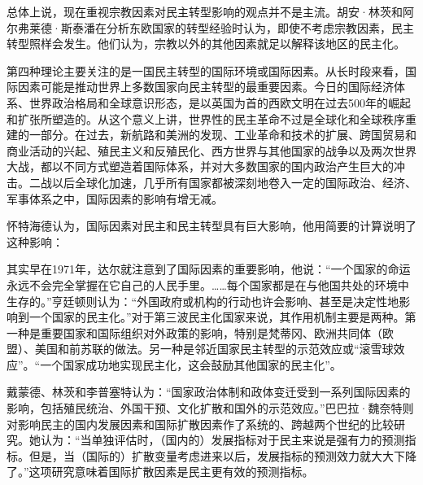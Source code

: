 总体上说，现在重视宗教因素对民主转型影响的观点并不是主流。胡安·林茨和阿尔弗莱德·斯泰潘在分析东欧国家的转型经验时认为，即使不考虑宗教因素，民主转型照样会发生。他们认为，宗教以外的其他因素就足以解释该地区的民主化。


第四种理论主要关注的是一国民主转型的国际环境或国际因素。从长时段来看，国际因素可能是推动世界上多数国家向民主转型的最重要因素。今日的国际经济体系、世界政治格局和全球意识形态，是以英国为首的西欧文明在过去500年的崛起和扩张所塑造的。从这个意义上讲，世界性的民主革命不过是全球化和全球秩序重建的一部分。在过去，新航路和美洲的发现、工业革命和技术的扩展、跨国贸易和商业活动的兴起、殖民主义和反殖民化、西方世界与其他国家的战争以及两次世界大战，都以不同方式塑造着国际体系，并对大多数国家的国内政治产生巨大的冲击。二战以后全球化加速，几乎所有国家都被深刻地卷入一定的国际政治、经济、军事体系之中，国际因素的影响有增无减。

怀特海德认为，国际因素对民主和民主转型具有巨大影响，他用简要的计算说明了这种影响：


其实早在1971年，达尔就注意到了国际因素的重要影响，他说：“一个国家的命运永远不会完全掌握在它自己的人民手里。……每个国家都是在与他国共处的环境中生存的。”亨廷顿则认为：“外国政府或机构的行动也许会影响、甚至是决定性地影响到一个国家的民主化。”对于第三波民主化国家来说，其作用机制主要是两种。第一种是重要国家和国际组织对外政策的影响，特别是梵蒂冈、欧洲共同体（欧盟）、美国和前苏联的做法。另一种是邻近国家民主转型的示范效应或“滚雪球效应”。“一个国家成功地实现民主化，这会鼓励其他国家的民主化”。

戴蒙德、林茨和李普塞特认为：“国家政治体制和政体变迁受到一系列国际因素的影响，包括殖民统治、外国干预、文化扩散和国外的示范效应。”巴巴拉·魏奈特则对影响民主的国内发展因素和国际扩散因素作了系统的、跨越两个世纪的比较研究。她认为：“当单独评估时，（国内的）发展指标对于民主来说是强有力的预测指标。但是，当（国际的）扩散变量考虑进来以后，发展指标的预测效力就大大下降了。”这项研究意味着国际扩散因素是民主更有效的预测指标。

